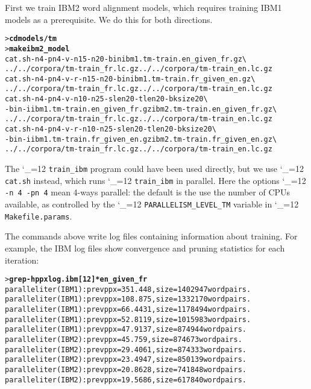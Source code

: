 \documentclass[11pt,letterpaper]{article}
\newcommand{\bs}{\textbackslash{}}
\def\code{\begingroup\catcode`\_=12 \codex}
\newcommand{\codex}[1]{\texttt{#1}\endgroup}
\begin{document}
First we train IBM2 word alignment models, which requires training IBM1 models
as a prerequisite.  We do this for both directions.
\begin{small}
\begin{alltt}
   > \textbf{cd models/tm}
   > \textbf{make ibm2_model}
   cat.sh -n 4 -pn 4 -v -n1 5 -n2 0 -bin ibm1.tm-train.en_given_fr.gz \bs
      ../../corpora/tm-train_fr.lc.gz ../../corpora/tm-train_en.lc.gz
   cat.sh -n 4 -pn 4 -v -r -n1 5 -n2 0 -bin ibm1.tm-train.fr_given_en.gz \bs
      ../../corpora/tm-train_fr.lc.gz ../../corpora/tm-train_en.lc.gz
   cat.sh -n 4 -pn 4 -v -n1 0 -n2 5 -slen 20 -tlen 20 -bksize 20 \bs
      -bin -i ibm1.tm-train.en_given_fr.gz ibm2.tm-train.en_given_fr.gz \bs
      ../../corpora/tm-train_fr.lc.gz ../../corpora/tm-train_en.lc.gz
   cat.sh -n 4 -pn 4 -v -r -n1 0 -n2 5 -slen 20 -tlen 20 -bksize 20 \bs
      -bin -i ibm1.tm-train.fr_given_en.gz ibm2.tm-train.fr_given_en.gz \bs
      ../../corpora/tm-train_fr.lc.gz ../../corpora/tm-train_en.lc.gz
\end{alltt}
\end{small}
The \code{train_ibm} program could have been used directly, but we use
\code{cat.sh} instead, which runs \code{train_ibm} in parallel. Here the
options \code{-n 4 -pn 4} mean 4-ways parallel: the default is the use the
number of CPUs available, as controlled by the \code{PARALLELISM_LEVEL_TM}
variable in \code{Makefile.params}.

The commands above write log files containing information about training.  For
example, the IBM log files show convergence and pruning statistics for each
iteration:
\begin{small}
\begin{alltt}
   > \textbf{grep -h ppx log.ibm[12]*en_given_fr}
   parallel iter (IBM1): prev ppx = 351.448, size = 1402947 word pairs.
   parallel iter (IBM1): prev ppx = 108.875, size = 1332170 word pairs.
   parallel iter (IBM1): prev ppx = 66.4431, size = 1178494 word pairs.
   parallel iter (IBM1): prev ppx = 52.8119, size = 1015983 word pairs.
   parallel iter (IBM1): prev ppx = 47.9137, size = 874944 word pairs.
   parallel iter (IBM2): prev ppx = 45.759, size = 874673 word pairs.
   parallel iter (IBM2): prev ppx = 29.4061, size = 874333 word pairs.
   parallel iter (IBM2): prev ppx = 23.4947, size = 850139 word pairs.
   parallel iter (IBM2): prev ppx = 20.8628, size = 741848 word pairs.
   parallel iter (IBM2): prev ppx = 19.5686, size = 617840 word pairs.
\end{alltt}
\end{small}
\end{document}
